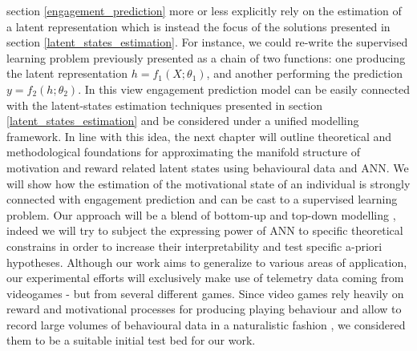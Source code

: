 section \ref{engagement_prediction} more or less explicitly rely on the estimation of a latent representation which is instead the focus of the solutions presented in section \ref{latent_states_estimation}. For instance, we could re-write the supervised learning problem previously presented as a chain of two functions: one producing the latent representation $h = f_1(X; \theta_1)$, and another performing the prediction $y = f_2(h; \theta_2)$. In this view engagement prediction model can be easily connected with the latent-states estimation techniques presented in section \ref{latent_states_estimation} and be considered under a unified modelling framework. In line with this idea, the next chapter will outline theoretical and methodological foundations for approximating the manifold structure of motivation and reward related latent states using behavioural data and ANN.  We will show how the estimation of the motivational state of an individual is strongly connected with engagement prediction and can be cast to a supervised learning problem. Our approach will be a blend of bottom-up and top-down modelling \cite{yannakakis2013player}, indeed we will try to subject the expressing power of ANN to specific theoretical constrains in order to increase their interpretability and test specific a-priori hypotheses. Although our work aims to generalize to various areas of application, our experimental efforts will exclusively make use of telemetry data coming from videogames - but from several different games. Since video games rely heavily on reward and motivational processes for producing playing behaviour  \cite{chumbley2006affect,wang2011game,phillips2013videogame,avserivskis2017computational, agarwal2017quitting, steyvers2019joint} and allow to record large volumes of behavioural data in a naturalistic fashion \cite{drachen2015behavioral}, we considered them to be a suitable initial test bed for our work.